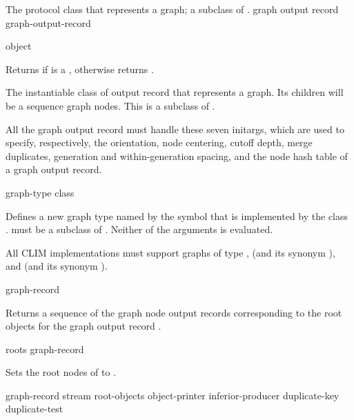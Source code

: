 
The protocol class that represents a graph; a subclass of .
 {graph output record} {graph-output-record}

 {object}

Returns  if  is a , otherwise
returns .


The instantiable class of output record that represents a graph.  Its children
will be a sequence graph nodes.  This is a subclass of .


All the graph output record must handle these seven initargs, which are used to
specify, respectively, the orientation, node centering, cutoff depth, merge
duplicates, generation and within-generation spacing, and the node hash table of
a graph output record.


 {graph-type class}

Defines a new graph type named by the symbol  that is
implemented by the class .   must be a subclass of
.  Neither of the arguments is evaluated.

All CLIM implementations must support graphs of type ,
 (and its synonym ), and
 (and its synonym ).


 {graph-record}

Returns a sequence of the graph node output records corresponding to the root
objects for the graph output record .

 {roots graph-record}

Sets the root nodes of  to .


 {graph-record stream
                                    root-objects object-printer inferior-producer 
                                    \key duplicate-key duplicate-test}

